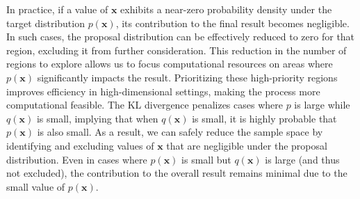 \documentclass[pdflatex,sn-mathphys-num]{sn-jnl}%
\theoremstyle{thmstyleone}%
\theoremstyle{thmstyletwo}%
\theoremstyle{thmstylethree}%
\begin{document}
In practice, if a value of $\mathbf{x}$ exhibits a near-zero probability density under the target distribution $p\left(\mathbf{x}\right)$, its contribution to the final result becomes negligible. In such cases, the proposal distribution can be effectively reduced to zero for that region, excluding it from further consideration. This reduction in the number of regions to explore allows us to focus computational resources on areas where $p\left(\mathbf{x}\right)$ significantly impacts the result. Prioritizing these high-priority regions improves efficiency in high-dimensional settings, making the process more computational feasible. The KL divergence penalizes cases where $p$ is large while $q\left(\mathbf{x}\right)$ is small, implying that when $q\left(\mathbf{x}\right)$ is small, it is highly probable that $p\left(\mathbf{x}\right)$ is also small. As a result, we can safely reduce the sample space by identifying and excluding values of $\mathbf{x}$ that are negligible under the proposal distribution. Even in cases where $p\left(\mathbf{x}\right)$ is small but $q\left(\mathbf{x}\right)$ is large (and thus not excluded), the contribution to the overall result remains minimal due to the small value of $p\left(\mathbf{x}\right)$.
\end{document}
